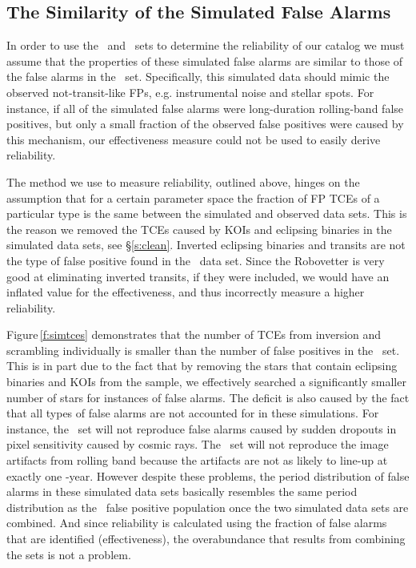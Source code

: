 \subsection{The Similarity of the Simulated False Alarms}
\label{s:simularity}
In order to use the \scrtce\ and \invtce\ sets to determine the reliability of our catalog we must assume that the properties of these simulated false alarms are similar to those of the false alarms in the \opstce\ set.  Specifically, this simulated data should mimic the observed not-transit-like FPs, e.g. instrumental noise and stellar spots.  For instance, if all of the simulated false alarms were long-duration rolling-band false positives, but only a small fraction of the observed false positives were caused by this mechanism, our effectiveness measure could not be used to easily derive reliability.

The method we use to measure reliability, outlined above, hinges on the assumption that for a certain parameter space the fraction of FP TCEs of a particular type is the same between the simulated and observed data sets.  This is the reason we removed the TCEs caused by KOIs and eclipsing binaries in the simulated data sets, see \S\ref{s:clean}. Inverted eclipsing binaries and transits are not the type of false positive found in the \opstce\ data set.  Since the Robovetter is very good at eliminating inverted transits, if they were included, we would have an inflated value for the effectiveness, and thus incorrectly measure a higher reliability. 

Figure\,\ref{f:simtces} demonstrates that the number of TCEs from inversion and scrambling individually is smaller than the number of false positives in the \opstce\ set. This is in part due to the fact that by removing the stars that contain eclipsing binaries and KOIs from the sample, we effectively searched a significantly smaller number of stars for instances of false alarms. The deficit is also caused by the fact that all types of false alarms are not accounted for in these simulations. For instance, the \invtce\ set will not reproduce false alarms caused by sudden dropouts in pixel sensitivity caused by cosmic rays. The \scrtce\ set will not reproduce the image artifacts from rolling band because the artifacts are not as likely to line-up at exactly one \Kepler -year.  However despite these problems, the period distribution of false alarms in these simulated data sets basically resembles the same period distribution as the \opstce\ false positive population once the two simulated data sets are combined. And since reliability is calculated using the fraction of false alarms that are identified (effectiveness), the overabundance that results from combining the sets is not a problem.

